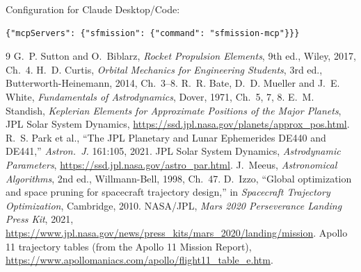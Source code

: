 \documentclass[11pt,a4paper]{article}
\begin{document}
\medskip\noindent Configuration for Claude Desktop/Code:
\begin{lstlisting}
{"mcpServers": {"sfmission": {"command": "sfmission-mcp"}}}
\end{lstlisting}

\begin{thebibliography}{9}
 G.~P. Sutton and O.~Biblarz, \emph{Rocket Propulsion Elements}, 9th ed., Wiley, 2017, Ch.~4.
 H.~D. Curtis, \emph{Orbital Mechanics for Engineering Students}, 3rd ed., Butterworth-Heinemann, 2014, Ch.~3--8.
 R.~R. Bate, D.~D. Mueller and J.~E. White, \emph{Fundamentals of Astrodynamics}, Dover, 1971, Ch.~5, 7, 8.
 E.~M. Standish, \emph{Keplerian Elements for Approximate Positions of the Major Planets}, JPL Solar System Dynamics, \url{https://ssd.jpl.nasa.gov/planets/approx_pos.html}.
 R.~S. Park et al., ``The JPL Planetary and Lunar Ephemerides DE440 and DE441,'' \emph{Astron.\ J.} 161:105, 2021.
 JPL Solar System Dynamics, \emph{Astrodynamic Parameters}, \url{https://ssd.jpl.nasa.gov/astro_par.html}.
 J.~Meeus, \emph{Astronomical Algorithms}, 2nd ed., Willmann-Bell, 1998, Ch.~47.
 D.~Izzo, ``Global optimization and space pruning for spacecraft trajectory design,'' in \emph{Spacecraft Trajectory Optimization}, Cambridge, 2010.
 NASA/JPL, \emph{Mars 2020 Perseverance Landing Press Kit}, 2021, \url{https://www.jpl.nasa.gov/news/press_kits/mars_2020/landing/mission}.
 Apollo 11 trajectory tables (from the Apollo 11 Mission Report), \url{https://www.apollomaniacs.com/apollo/flight11_table_e.htm}.
\end{thebibliography}
\end{document}
